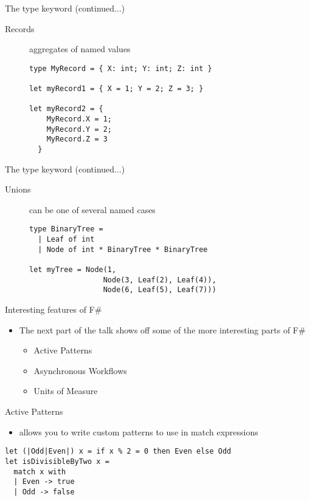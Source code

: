 \documentclass[landscape]{slides}
\begin{document}
\begin{slide}{The type keyword (continued...)}
\begin{description}
\item[Records] aggregates of named values
\begin{verbatim}
type MyRecord = { X: int; Y: int; Z: int }

let myRecord1 = { X = 1; Y = 2; Z = 3; }

let myRecord2 = {
    MyRecord.X = 1; 
    MyRecord.Y = 2; 
    MyRecord.Z = 3 
  }
\end{verbatim}
\end{description}
\end{slide}

\begin{slide}{The type keyword (continued...)}
\begin{description}
\item[Unions] can be one of several named cases 
\begin{verbatim}
type BinaryTree =
  | Leaf of int
  | Node of int * BinaryTree * BinaryTree

let myTree = Node(1, 
                 Node(3, Leaf(2), Leaf(4)), 
                 Node(6, Leaf(5), Leaf(7)))
\end{verbatim}
\end{description}
\end{slide}

\begin{slide}{Interesting features of F\#}
\begin{itemize}
\item The next part of the talk shows off some of the more interesting parts of F\#
\begin{itemize}
\item Active Patterns
\item Asynchronous Workflows
\item Units of Measure
\end{itemize}
\end{itemize}
\end{slide}

\begin{slide}{Active Patterns}
\begin{itemize}
\item allows you to write custom patterns to use in match expressions
\end{itemize}
\begin{verbatim}
let (|Odd|Even|) x = if x % 2 = 0 then Even else Odd
let isDivisibleByTwo x = 
  match x with 
  | Even -> true 
  | Odd -> false
\end{verbatim}
\end{slide}
\end{document}
